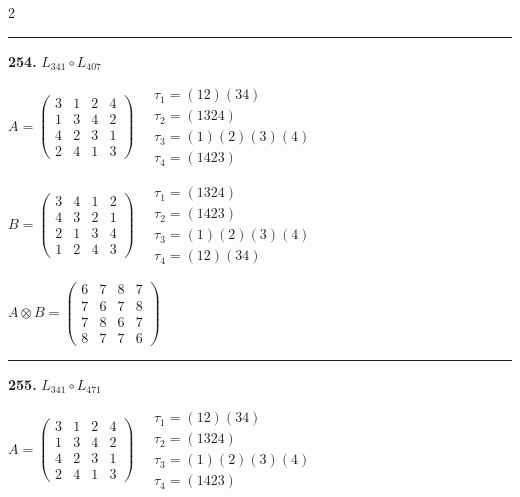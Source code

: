\begin{multicols}{2}
\vspace{0.3em}
\hrule
\vspace{0.3em}

\noindent\textbf{254.} $L_{341} \circ L_{407}$

$A = \begin{pmatrix} 3 & 1 & 2 & 4 \\ 1 & 3 & 4 & 2 \\ 4 & 2 & 3 & 1 \\ 2 & 4 & 1 & 3 \end{pmatrix} \quad \begin{matrix} \tau_{1}=(1 2)(3 4) \\ \tau_{2}=(1 3 2 4) \\ \tau_{3}=(1)(2)(3)(4) \\ \tau_{4}=(1 4 2 3) \end{matrix}$

$B = \begin{pmatrix} 3 & 4 & 1 & 2 \\ 4 & 3 & 2 & 1 \\ 2 & 1 & 3 & 4 \\ 1 & 2 & 4 & 3 \end{pmatrix} \quad \begin{matrix} \tau_{1}=(1 3 2 4) \\ \tau_{2}=(1 4 2 3) \\ \tau_{3}=(1)(2)(3)(4) \\ \tau_{4}=(1 2)(3 4) \end{matrix}$

$A \otimes B = \begin{pmatrix} 6 & 7 & 8 & 7 \\ 7 & 6 & 7 & 8 \\ 7 & 8 & 6 & 7 \\ 8 & 7 & 7 & 6 \end{pmatrix}$

\vspace{0.3em}
\hrule
\vspace{0.3em}

\noindent\textbf{255.} $L_{341} \circ L_{471}$

$A = \begin{pmatrix} 3 & 1 & 2 & 4 \\ 1 & 3 & 4 & 2 \\ 4 & 2 & 3 & 1 \\ 2 & 4 & 1 & 3 \end{pmatrix} \quad \begin{matrix} \tau_{1}=(1 2)(3 4) \\ \tau_{2}=(1 3 2 4) \\ \tau_{3}=(1)(2)(3)(4) \\ \tau_{4}=(1 4 2 3) \end{matrix}$


\end{multicols}
